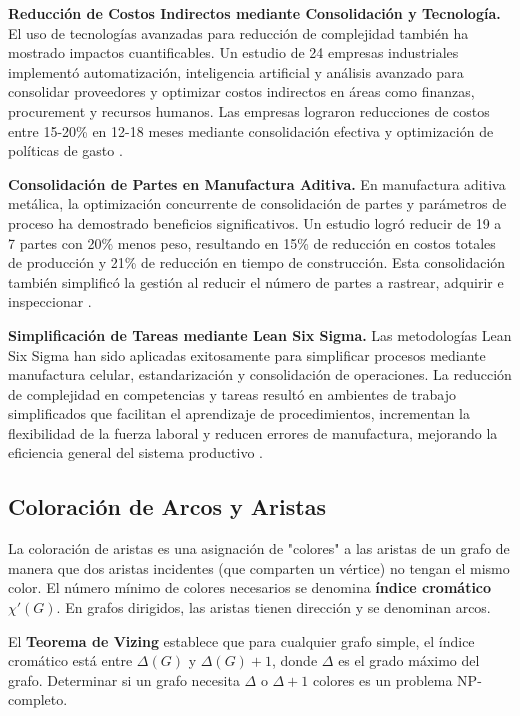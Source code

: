 \documentclass{article}
\begin{document}
\textbf{Reducción de Costos Indirectos mediante Consolidación y Tecnología.}
El uso de tecnologías avanzadas para reducción de complejidad también ha mostrado impactos cuantificables. Un estudio de 24 empresas industriales implementó automatización, inteligencia artificial y análisis avanzado para consolidar proveedores y optimizar costos indirectos en áreas como finanzas, procurement y recursos humanos. Las empresas lograron reducciones de costos entre 15-20\% en 12-18 meses mediante consolidación efectiva y optimización de políticas de gasto \citep{mckinsey2020}.

\textbf{Consolidación de Partes en Manufactura Aditiva.}
En manufactura aditiva metálica, la optimización concurrente de consolidación de partes y parámetros de proceso ha demostrado beneficios significativos. Un estudio logró reducir de 19 a 7 partes con 20\% menos peso, resultando en 15\% de reducción en costos totales de producción y 21\% de reducción en tiempo de construcción. Esta consolidación también simplificó la gestión al reducir el número de partes a rastrear, adquirir e inspeccionar \citep{additive_manufacturing2019}.

\textbf{Simplificación de Tareas mediante Lean Six Sigma.}
Las metodologías Lean Six Sigma han sido aplicadas exitosamente para simplificar procesos mediante manufactura celular, estandarización y consolidación de operaciones. La reducción de complejidad en competencias y tareas resultó en ambientes de trabajo simplificados que facilitan el aprendizaje de procedimientos, incrementan la flexibilidad de la fuerza laboral y reducen errores de manufactura, mejorando la eficiencia general del sistema productivo \citep{lean_six_sigma2025}.

\subsection*{Coloración de Arcos y Aristas}

La coloración de aristas es una asignación de "colores" a las aristas de un grafo de manera que dos aristas incidentes (que comparten un vértice) no tengan el mismo color. El número mínimo de colores necesarios se denomina \textbf{índice cromático} $\chi'(G)$. En grafos dirigidos, las aristas tienen dirección y se denominan arcos.

El \textbf{Teorema de Vizing} establece que para cualquier grafo simple, el índice cromático está entre $\Delta(G)$ y $\Delta(G)+1$, donde $\Delta$ es el grado máximo del grafo. Determinar si un grafo necesita $\Delta$ o $\Delta+1$ colores es un problema NP-completo.
\end{document}
